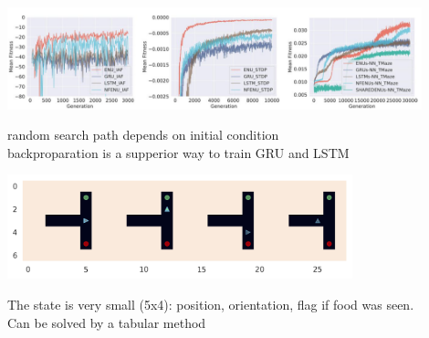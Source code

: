 \documentclass[aspectratio=169,8pt]{beamer}
\begin{document}
\eframe

\begin{center}
  \includegraphics[width=0.90\textwidth]{i/lines.png}
\end{center}
random search path depends on initial condition \\
backproparation is a supperior way to train GRU and LSTM
\eframe

\begin{center}
  \includegraphics[width=0.75\textwidth]{i/maze.png}
\end{center}
The state is very small (5x4): position, orientation, flag if food was seen. \\
Can be solved by a tabular method
\eframe
\end{document}
